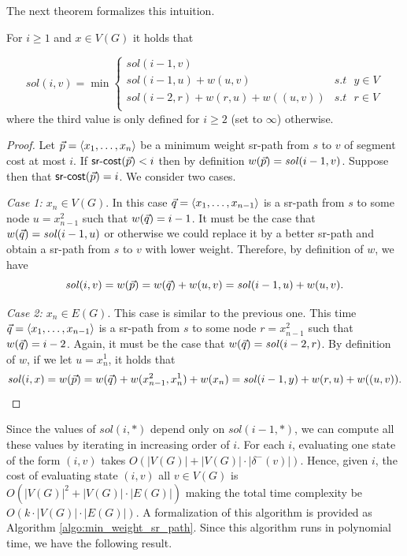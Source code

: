 The next theorem formalizes this intuition. 
 
\begin{theorem}
\label{thm:minwsrpath}
For $i \geq 1$ and $x \in V(G)$ it holds that

\small
\[\mathit{sol}(i, v) = \min \left\{
  \begin{matrix}
    \mathit{sol}(i - 1, v) &  \\[0.2cm]
    \mathit{sol}(i - 1, u)  +  w(u, v)  & s.t \text{ $y \in V$} \\[0.2cm]
    \mathit{sol}(i - 2, r)  +  w(r, u) + w((u, v)) & s.t \text{ $r \in V$} \\
\end{matrix}
  \right.
\]
\normalsize 
where the third value is only defined for $i \geq 2$ (set to $\infty$) otherwise.
\end{theorem}

\begin{proof}
Let $\vec{p} = \langle x_1, \ldots, x_n \rangle$ be a minimum weight sr-path from $s$ to $v$ of segment cost at most $i$. If 
$\textsf{sr-cost}(\vec{p}) < i$ then by definition $w(\vec{p}) = \mathit{sol}(i - 1, v)$. Suppose then
that $\textsf{sr-cost}(\vec{p}) = i$. We consider two cases.

\emph{Case 1: $x_n \in V(G)$}. In this case $\vec{q} = \langle x_1, \ldots, x_{n - 1} \rangle$ is a sr-path from $s$ to some node
$u = x^2_{n - 1}$ such that $w(\vec{q}) = i - 1$. It must be the case that $w(\vec{q}) = \mathit{sol}(i - 1, u)$ or otherwise 
we could replace it by a better sr-path and obtain a sr-path from $s$ to $v$ with lower weight. Therefore, by definition of $w$, we have
$$
\mathit{sol}(i, v) = w(\vec{p}) = w(\vec{q}) + w(u, v) = \mathit{sol}(i - 1, u) + w(u, v).
$$

\emph{Case 2: $x_n \in E(G)$}. This case is similar to the previous one. This time $\vec{q} = \langle x_1, \ldots, x_{n - 1} \rangle$ is a sr-path from $s$ to some node
$r = x^2_{n - 1}$ such that $w(\vec{q}) = i - 2$. Again, it must be the case that $w(\vec{q}) = \mathit{sol}(i - 2, r)$.
By definition of $w$, if we let $u = x^1_n$, it holds that
$$
\mathit{sol}(i, x) = w(\vec{p}) = w(\vec{q}) + w(x^2_{n - 1}, x^1_n) + w(x_n) = \mathit{sol}(i - 1, y) + w(r, u) + w((u, v)).
$$
\end{proof}

Since the values of $\mathit{sol}(i, *)$ depend only on $\mathit{sol}(i - 1, *)$, we can compute all these
values by iterating in increasing order of $i$. For each $i$, evaluating one state of the form
$(i, v)$ takes $O(|V(G)| + |V(G)| \cdot |\delta^-(v)|)$. Hence, given $i$, the cost of evaluating state $(i, v)$ 
all $v \in V(G)$ is $O(|V(G)|^2 + |V(G)| \cdot |E(G)|)$ making the total time complexity be $O(k \cdot |V(G)| \cdot |E(G)|)$.
A formalization of this algorithm is provided as Algorithm \ref{algo:min_weight_sr_path}.
Since this algorithm runs in polynomial time, we have the following result.

